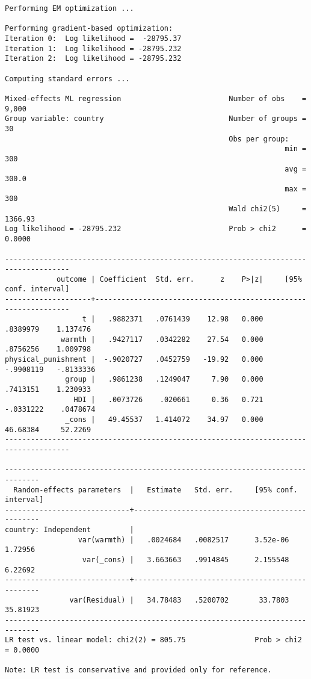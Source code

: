 \documentclass[
  letterpaper,
  DIV=11,
  numbers=noendperiod]{scrreprt}
\begin{document}
\begin{verbatim}
Performing EM optimization ...

Performing gradient-based optimization: 
Iteration 0:  Log likelihood =  -28795.37  
Iteration 1:  Log likelihood = -28795.232  
Iteration 2:  Log likelihood = -28795.232  

Computing standard errors ...

Mixed-effects ML regression                         Number of obs    =   9,000
Group variable: country                             Number of groups =      30
                                                    Obs per group:
                                                                 min =     300
                                                                 avg =   300.0
                                                                 max =     300
                                                    Wald chi2(5)     = 1366.93
Log likelihood = -28795.232                         Prob > chi2      =  0.0000

-------------------------------------------------------------------------------------
            outcome | Coefficient  Std. err.      z    P>|z|     [95% conf. interval]
--------------------+----------------------------------------------------------------
                  t |   .9882371   .0761439    12.98   0.000     .8389979    1.137476
             warmth |   .9427117   .0342282    27.54   0.000     .8756256    1.009798
physical_punishment |  -.9020727   .0452759   -19.92   0.000    -.9908119   -.8133336
              group |   .9861238   .1249047     7.90   0.000     .7413151    1.230933
                HDI |   .0073726    .020661     0.36   0.721    -.0331222    .0478674
              _cons |   49.45537   1.414072    34.97   0.000     46.68384     52.2269
-------------------------------------------------------------------------------------

------------------------------------------------------------------------------
  Random-effects parameters  |   Estimate   Std. err.     [95% conf. interval]
-----------------------------+------------------------------------------------
country: Independent         |
                 var(warmth) |   .0024684   .0082517      3.52e-06     1.72956
                  var(_cons) |   3.663663   .9914845      2.155548     6.22692
-----------------------------+------------------------------------------------
               var(Residual) |   34.78483   .5200702       33.7803    35.81923
------------------------------------------------------------------------------
LR test vs. linear model: chi2(2) = 805.75                Prob > chi2 = 0.0000

Note: LR test is conservative and provided only for reference.
\end{verbatim}
\end{document}

